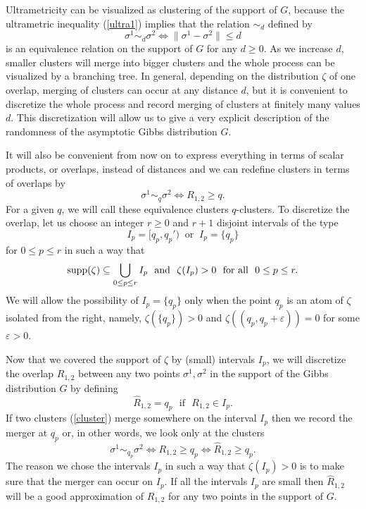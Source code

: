 \documentclass[12pt]{article}
\newcommand{\eps}{{\varepsilon}}
\theoremstyle{nonumberplain}
\begin{document}
Ultrametricity can be visualized as clustering of the support of $G$, because the ultrametric inequality (\ref{ultra1}) implies that the relation $\sim_d$ defined by
\begin{equation}
\sigma^1 \sim_d \sigma^2 \Longleftrightarrow \|{\sigma}^1 - {\sigma}^2\| \leq d
\label{diameter}
\end{equation}
is an equivalence relation on the support of $G$ for any $d\geq 0$. As we increase $d$, smaller clusters will merge into bigger clusters and the whole process can be visualized by a branching tree. In general, depending on the distribution $\zeta$ of one overlap, merging of clusters can occur at any distance $d$, but it is convenient to discretize the whole process and record merging of clusters at finitely many values $d$. This discretization will allow us to give a very explicit description of the randomness of the asymptotic Gibbs distribution $G$.

It will also be convenient from now on to express everything in terms of scalar products, or overlaps, instead of distances and we can redefine clusters in terms of overlaps by
\begin{equation}
\sigma^1 \sim_q \sigma^2 \Longleftrightarrow R_{1,2} \geq q.
\label{cluster}
\end{equation}
For a given $q$, we will call these equivalence clusters $q$-clusters. To discretize the overlap, let us choose an integer $r\geq 0$ and $r+1$ disjoint intervals of the type
\begin{equation}
I_p = [q_p,q_p') \ \mbox{ or }\ I_p = \{q_p\}
\label{ch31qs}
\end{equation}
for $0\leq p \leq r$ in such a way that
\begin{equation}
{\rm supp}(\zeta)\subseteq \bigcup_{0\leq p\leq r} I_p \ \mbox{ and }\ \zeta(I_p) >0 \ \mbox{ for all }\ 0\leq p\leq r.
\label{intervals}
\end{equation}
We will allow the possibility of $I_p = \{q_p\}$ only when the point $q_p$ is an atom of $\zeta$ isolated from the right, namely, $\zeta(\{q_p\})>0$ and $\zeta((q_p,q_p +\eps))=0$ for some $\eps>0.$ 

Now that we covered the support of $\zeta$ by (small) intervals $I_p$, we will discretize the overlap $R_{1,2}$ between any two points $\sigma^1,\sigma^2$ in the support of the Gibbs distribution $G$ by defining 
\begin{equation}
\hat{R}_{1,2} = q_p \,\,\mbox{ if }\,\, R_{1,2} \in I_p.
\end{equation}
If two clusters (\ref{cluster}) merge somewhere on the interval $I_p$ then we record the merger at $q_p$ or, in other words, we look only at the clusters
\begin{equation}
\sigma^1 \sim_{q_p} \sigma^2 \Longleftrightarrow R_{1,2} \geq q_p 
\Longleftrightarrow \hat{R}_{1,2} \geq q_p.
\end{equation}
The reason we chose the intervals $I_p$ in such a way that $\zeta(I_p) >0$ is to make sure that the merger can occur on $I_p$. If all the intervals $I_p$ are small then $\hat{R}_{1,2}$ will be a good approximation of $R_{1,2}$ for any two points in the support of $G$.
\end{document}
